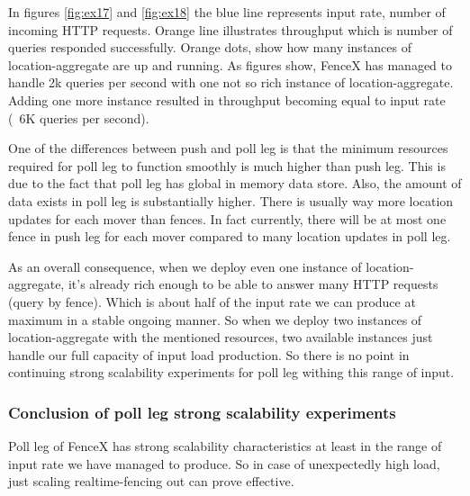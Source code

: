 \documentclass[a4]{report}
\begin{document}
    In figures \ref{fig:ex17} and \ref{fig:ex18} the blue line represents input rate, number of incoming HTTP
    requests.
    Orange line illustrates throughput which is number of queries responded successfully.
    Orange dots, show how many instances of location-aggregate are up and running.
    As figures show, FenceX has managed to handle 2k queries per second with one not so rich instance of location-aggregate.
    Adding one more instance resulted in throughput becoming equal to input rate (~6K queries per second).

    One of the differences between push and poll leg is that the minimum resources required for poll leg to function
    smoothly is much higher than push leg.
    This is due to the fact that poll leg has global in memory data store.
    Also, the amount of data exists in poll leg is substantially higher.
    There is usually way more location updates for each mover than fences.
    In fact currently, there will be at most one fence in push leg for each mover compared to many location updates
    in poll leg.

    As an overall consequence, when we deploy even one instance of location-aggregate, it's already rich enough to be
    able to answer many HTTP requests (query by fence).
    Which is about half of the input rate we can produce at maximum in a stable ongoing manner.
    So when we deploy two instances of location-aggregate with the mentioned resources, two available instances just
    handle our full capacity of input load production.
    So there is no point in continuing strong scalability experiments for poll leg withing this range of input.

    \subsubsection{Conclusion of poll leg strong scalability experiments}
    Poll leg of FenceX has strong scalability characteristics at least in the range of input rate we have managed to
    produce.
    So in case of unexpectedly high load, just scaling realtime-fencing out can prove effective.
\end{document}
